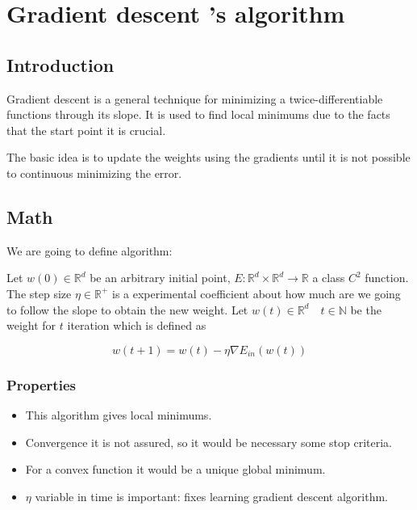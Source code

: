 

\section{ Gradient descent 's algorithm }
\subsection{Introduction}

Gradient descent is a general technique for minimizing a twice-differentiable functions through its slope. \cite{LFD}
It is used to find local minimums due to the facts that the start point it is crucial.

The basic idea is to update the weights using the gradients until it is not possible to continuous minimizing the error.


\medskip

\subsection{Math}

We are going to define  algorithm:

Let $w(0) \in \mathbb{R}^d$ be an arbitrary initial point,
$E : \mathbb{R}^d \times \mathbb{R}^d \longrightarrow \mathbb R$
a class $C^2$ function. The step size $\eta \in \mathbb{R}^+$
is a experimental coefficient about how much are we going to follow the slope to obtain the new weight.  
Let  $w(t) \in \mathbb{R}^d  \quad t \in \mathbb N$ be the weight for $t$ iteration which is defined as

\begin{equation*}
  w(t+1) = w(t) - \eta \nabla E_{in}(w(t))
\end{equation*}

\subsubsection{ Properties}

\begin{itemize}
\item This algorithm gives local minimums.
\item Convergence it is not assured, so it would be necessary some stop criteria. 
\item For a convex function it would be a unique global minimum.
\item $\eta$ variable in time  is important: fixes learning gradient descent algorithm. 
\end{itemize}


